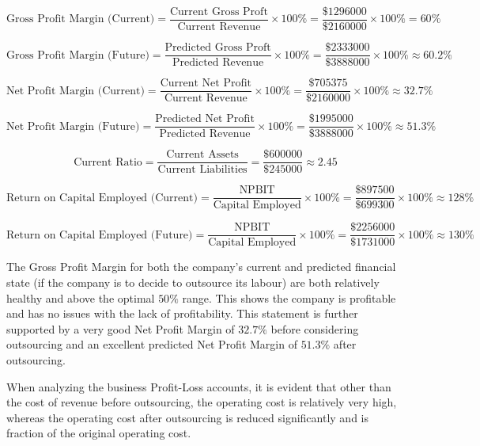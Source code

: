 
	$$\text{Gross Profit Margin (Current)} = \frac{\text{Current Gross Proft}}{\text{Current Revenue}}\times 100\% = \frac{\$1296000}{\$2160000}\times 100\% = 60\%$$


	$$\text{Gross Profit Margin (Future)} = \frac{\text{Predicted Gross Proft}}{\text{Predicted Revenue}}\times 100\% = \frac{\$2333000}{\$3888000}\times 100\% \approx 60.2\%$$
	

	$$\text{Net Profit Margin (Current)} = \frac{\text{Current Net Profit}}{\text{Current Revenue}}\times 100\% = \frac{\$705375}{\$2160000}\times 100\% \approx 32.7\%$$
	

	$$\text{Net Profit Margin (Future)} = \frac{\text{Predicted Net Profit}}{\text{Predicted Revenue}}\times 100\% = \frac{\$1995000}{\$3888000}\times 100\% \approx 51.3\%$$
	

	$$\text{Current Ratio} = \frac{\text{Current Assets}}{\text{Current Liabilities}} = \frac{\$600000}{\$245000} \approx 2.45$$
	

	$$\text{Return on Capital Employed (Current)} = \frac{\text{NPBIT}}{\text{Capital Employed}}\times 100\% = \frac{\$897500}{\$699300}\times 100\% \approx 128\%$$
	

	$$\text{Return on Capital Employed (Future)} = \frac{\text{NPBIT}}{\text{Capital Employed}}\times 100\% = \frac{\$2256000}{\$1731000}\times 100\% \approx 130\%$$

	{The Gross Profit Margin for both the company's current and predicted financial state (if the company is to decide to outsource its labour) are both relatively healthy and above the optimal $50\%$ range. This shows the company is profitable and has no issues with the lack of profitability. This statement is further supported by a very good Net Profit Margin of $32.7\%$ before considering outsourcing and an excellent predicted Net Profit Margin of $51.3\%$ after outsourcing.}
	
	{When analyzing the business Profit-Loss accounts, it is evident that other than the cost of revenue before outsourcing, the operating cost is relatively very high, whereas the operating cost after outsourcing is reduced significantly and is fraction of the original operating cost.}
	

